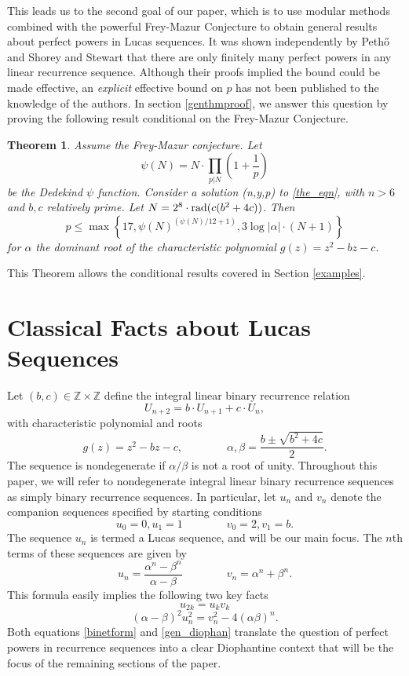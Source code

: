 \documentclass[12pt]{amsart}
\newtheorem{ithm}{Theorem}
\theoremstyle{definition}
\def\Z{{\mathbb Z}}
\newcommand{\rad}{{\rm{rad}}}
\begin{document}
This leads us to the second goal of our paper, which is to use modular methods combined with the powerful Frey-Mazur Conjecture to obtain general results about perfect powers in Lucas sequences. It was shown independently by Peth{\H{o}} \cite{petho82} and Shorey and Stewart \cite{shorey83} that there are only finitely many perfect powers in any linear recurrence sequence.  Although their proofs implied the bound could be made effective, an \emph{explicit} effective bound on $p$ has not been published to the knowledge of the authors.  In section \ref{genthmproof}, we answer this question by proving the following result conditional on the Frey-Mazur Conjecture.


\begin{ithm}\label{condbound}
Assume the Frey-Mazur conjecture.  Let 
\[ \psi(N) = N \cdot \prod_{p|N} \left( 1 + \frac{1}{p} \right)\]
be the Dedekind $\psi$ function.  Consider a solution (n,y,p) to \eqref{the_eqn}, with $n > 6$ and $b,c$ relatively prime. Let $N = 2^8 \cdot \rad(c(b^2+4c))$. Then 
\[ p \leq \max\left\{17,   \psi(N)^{(\psi(N)/12+1)}, 3\log{|\alpha|} \cdot ( N+1)  \right\} \]
for $\alpha$ the dominant root of the characteristic polynomial $g(z) = z^2 -bz-c$.
\end{ithm}
This Theorem allows the conditional results covered in Section \ref{examples}.

\section{Classical Facts about Lucas Sequences}\label{classicalresults}


Let $(b,c) \in \Z \times \Z$ define the integral linear binary recurrence relation
\[ U_{n+2} = b\cdot U_{n+1}+ c\cdot U_n, \]
with characteristic polynomial and roots
\[ g(z) = z^2 - bz - c, \qquad \qquad \alpha, \beta = \frac{b \pm \sqrt{b^2+4c}}{2}.\]
The sequence is nondegenerate if $\alpha/\beta$ is not a root of unity.  Throughout this paper, we will refer to nondegenerate integral linear binary recurrence sequences as simply binary recurrence sequences.  In particular, let $u_n$ and $v_n$ denote the companion sequences specified by starting conditions
\[ u_0 = 0, u_1 = 1 \qquad \qquad v_0 = 2, v_1 = b .\]
The sequence $u_n$ is termed a Lucas sequence, and will be our main focus.  The $n$th terms of these sequences are given by 
\begin{equation}\label{binetform} u_n = \frac{\alpha^n - \beta^n}{\alpha - \beta} \qquad \qquad v_n = \alpha^n +\beta^n. \end{equation}
This formula easily implies the following two key facts
\begin{equation}\label{fib2} u_{2k} = u_kv_k \end{equation}
\begin{equation}\label{gen_diophan}(\alpha - \beta)^2u_n^2 = v_n^2 - 4(\alpha\beta)^n. \end{equation}
Both equations \ref{binetform} and \ref{gen_diophan} translate the question of perfect powers in recurrence sequences into a clear Diophantine context that will be the focus of the remaining sections of the paper.
\end{document}
